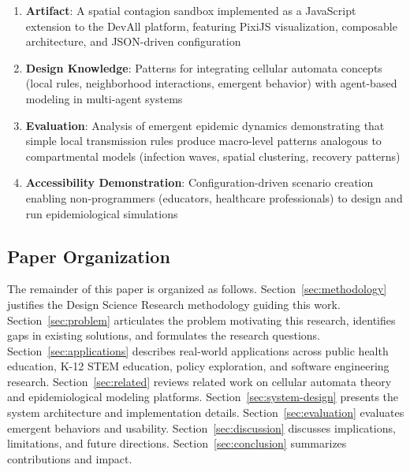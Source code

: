 \begin{enumerate}
    \item \textbf{Artifact}: A spatial contagion sandbox implemented as a JavaScript extension to the DevAll platform, featuring PixiJS visualization, composable architecture, and JSON-driven configuration
    
    \item \textbf{Design Knowledge}: Patterns for integrating cellular automata concepts (local rules, neighborhood interactions, emergent behavior) with agent-based modeling in multi-agent systems
    
    \item \textbf{Evaluation}: Analysis of emergent epidemic dynamics demonstrating that simple local transmission rules produce macro-level patterns analogous to compartmental models (infection waves, spatial clustering, recovery patterns)
    
    \item \textbf{Accessibility Demonstration}: Configuration-driven scenario creation enabling non-programmers (educators, healthcare professionals) to design and run epidemiological simulations
\end{enumerate}

\subsection{Paper Organization}

The remainder of this paper is organized as follows. Section~\ref{sec:methodology} justifies the Design Science Research methodology guiding this work. Section~\ref{sec:problem} articulates the problem motivating this research, identifies gaps in existing solutions, and formulates the research questions. Section~\ref{sec:applications} describes real-world applications across public health education, K-12 STEM education, policy exploration, and software engineering research. Section~\ref{sec:related} reviews related work on cellular automata theory and epidemiological modeling platforms. Section~\ref{sec:system-design} presents the system architecture and implementation details. Section~\ref{sec:evaluation} evaluates emergent behaviors and usability. Section~\ref{sec:discussion} discusses implications, limitations, and future directions. Section~\ref{sec:conclusion} summarizes contributions and impact.
